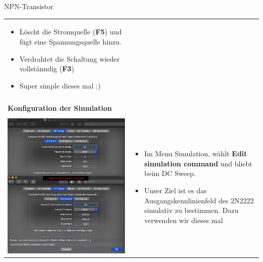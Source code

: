 \begin{frame}[t]{NPN-Transistor}
\begin{spacing}{0.9}
\begin{tiny}
\begin{table}[h!]
\begin{tabular}{p{3cm} p{7cm}}
\begin{minipage}{.7\textwidth}
\begin{itemize}
              \item Löscht die Stromquelle (\textbf{F5}) und fügt eine Spannungsquelle hinzu.
              \item Verdrahtet die Schaltung wieder vollstänndig (\textbf{F3})
              \item Super simple dieses mal :)
            \end{itemize}
          \end{minipage}
          \\
                                                & \\
          \hline
          \textbf{Konfiguration der Simulation} & \\
          \hline                                  \\
          \begin{minipage}{.3\textwidth}
            \includegraphics[width=0.8\linewidth]{pictures/simulationcmd_4.png}
          \end{minipage}
                                                &
          \begin{minipage}{.7\textwidth}
            \begin{itemize}
              \item Im Menu Simulation, wählt \textbf{Edit simulation command} und bliebt beim DC Sweep.
              \item Unser Ziel ist es das Ausgangskennlinienfeld des 2N2222 simulativ zu bestimmen. Dazu verwenden wir dieses mal

\end{itemize}
\end{minipage}
\end{tabular}
\end{table}
\end{tiny}
\end{spacing}
\end{frame}
